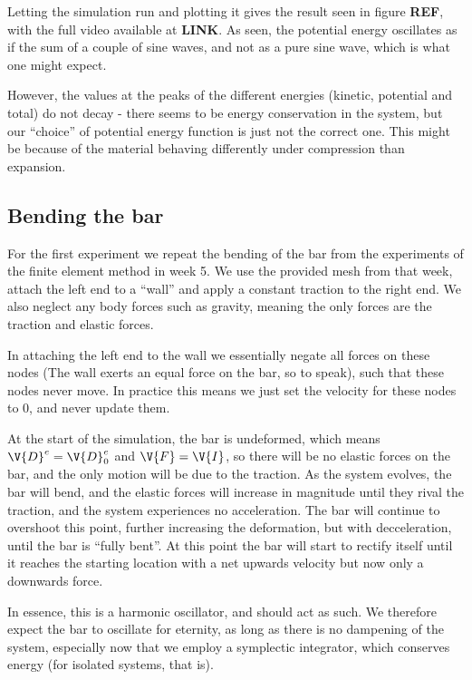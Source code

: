 \documentclass[sigconf]{acmart}
\begin{document}
Letting the simulation run and plotting it gives the result seen in figure \textbf{REF}, with the full video available at \textbf{LINK}. As seen, the potential energy oscillates as if the sum of a couple of sine waves, and not as a pure sine wave, which is what one might expect.

However, the values at the peaks of the different energies (kinetic, potential and total) do not decay - there seems to be energy conservation in the system, but our ``choice'' of potential energy function is just not the correct one. This might be because of the material behaving differently under compression than expansion.



\subsection{Bending the bar}
For the first experiment we repeat the bending of the bar from the experiments of the finite element method in week 5. We use the provided mesh from that week, attach the left end to a ``wall'' and apply a constant traction to the right end. We also neglect any body forces such as gravity, meaning the only forces are the traction and elastic forces.

In attaching the left end to the wall we essentially negate all forces on these nodes (The wall exerts an equal force on the bar, so to speak), such that these nodes never move. In practice this means we just set the velocity for these nodes to 0, and never update them.

At the start of the simulation, the bar is undeformed, which means $ \V{D}^e = \V{D}^e_0 $ and $ \V{F} = \V{I} $, so there will be no elastic forces on the bar, and the only motion will be due to the traction. As the system evolves, the bar will bend, and the elastic forces will increase in magnitude until they rival the traction, and the system experiences no acceleration. The bar will continue to overshoot this point, further increasing the deformation, but with decceleration, until the bar is ``fully bent''. At this point the bar will start to rectify itself until it reaches the starting location with a net upwards velocity but now only a downwards force.

In essence, this is a harmonic oscillator, and should act as such. We therefore expect the bar to oscillate for eternity, as long as there is no dampening of the system, especially now that we employ a symplectic integrator, which conserves energy (for isolated systems, that is).
\end{document}
